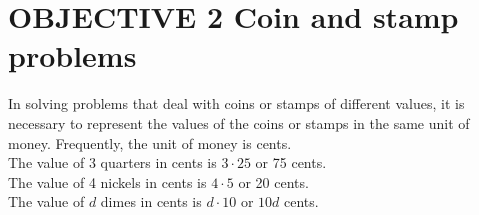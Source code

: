 \documentclass{ximera}
\begin{document}
\section*{OBJECTIVE 2 Coin and stamp problems}

In solving problems that deal with coins or stamps of different values, it is necessary to represent the values of the coins or stamps in the same unit of money. Frequently, the unit of money is cents.\\

The value of 3 quarters in cents is $3 \cdot 25$ or 75 cents.\\

The value of 4 nickels in cents is $4 \cdot 5$ or 20 cents.\\

The value of $d$ dimes in cents is $d \cdot 10$ or $10 d$ cents.\\
\end{document}
